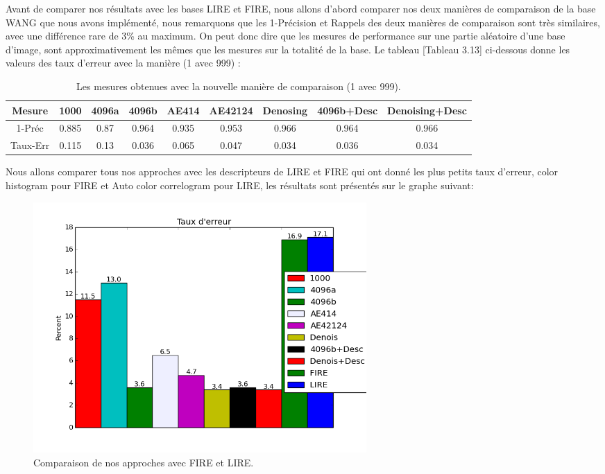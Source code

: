 	Avant de comparer nos résultats avec les bases LIRE et FIRE, nous allons d'abord comparer nos deux manières de comparaison de la base WANG que nous avons implémenté, nous remarquons que les 1-Précision et Rappels des deux manières de comparaison sont très similaires, avec une différence rare de 3\% au maximum. On peut donc dire que les mesures de performance sur une partie aléatoire d'une base d'image, sont approximativement les mêmes que les mesures sur la totalité de la base. Le tableau [Tableau 3.13] ci-dessous donne les valeurs des taux d'erreur avec la manière (1 avec 999) :

\begin{table}[H]
\begin{center}
\begin{tabular}{|c|c|c|c|c|c|c|c|c|}
\hline
	Mesure & 1000 & 4096a & 4096b & AE414 & AE42124 & Denosing & 4096b+Desc & Denoising+Desc\\
\hline
	1-Préc & 0.885 & 0.87 & 0.964 & 0.935 & 0.953 & 0.966 & 0.964 & 0.966\\
\hline
	Taux-Err & 0.115 & 0.13 & 0.036 & 0.065 & 0.047 & 0.034 & 0.036 & 0.034\\
\hline
\end{tabular}
\end{center}
\caption{Les mesures obtenues avec la nouvelle manière de comparaison (1 avec 999).}
\end{table}




	Nous allons comparer tous nos approches avec les descripteurs de LIRE et FIRE qui ont donné les plus petits taux d'erreur, color histogram pour FIRE et Auto color correlogram pour LIRE, les résultats sont présentés sur le graphe suivant:
	
\begin{figure}[H]
\centering
\includegraphics[width=5in]{Figures/results/res-wang5.png}
\caption[An Electron]{Comparaison de nos approches avec FIRE et LIRE.}
\label{fig:Electron}
\end{figure}
	
